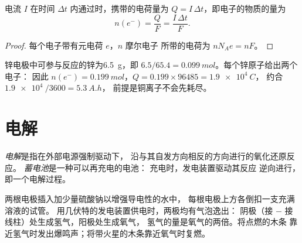\begin{proposition}[电荷与电子的物质的量]\label{prop:g12:cells-and-electrolysis:charge}
电流 $I$ 在时间 $\Delta t$ 内通过时，携带的电荷量为
$Q = I\,\Delta t$，即电子的物质的量为
\[
  n(e^-) = \frac{Q}{F} = \frac{I\,\Delta t}{F} .
\]
\end{proposition}

\begin{proof}
每个电子带有元电荷 $e$，$n$ 摩尔电子
所带的电荷为 $n N_A e = n F$。
\end{proof}

\begin{example}[丹尼尔电池的电量]\label{ex:g12:cells-and-electrolysis:capacity}
锌电极中可参与反应的锌为\qty{6.5}{g}，即
$6.5/65.4 = \qty{0.099}{mol}$。每个锌原子给出两个电子：
因此 $n(e^-) = \qty{0.199}{mol}$，$Q = 0.199 \times 96485 = \qty{1.9e4}{C}$，
约合 $\qty{1.9e4}{}/3600 = \qty{5.3}{A.h}$，
前提是铜离子不会先耗尽。
\end{example}

\section{电解}

\begin{definition}[电解，蓄电池]\label{def:g12:cells-and-electrolysis:electrolysis}
\emph{电解}是指在外部电源强制驱动下，
沿与其自发方向相反的方向进行的氧化还原反应。
\emph{蓄电池}是一种可以再充电的电池：
充电时，发电装置驱动其反应
逆向进行，即一个电解过程。
\end{definition}

\begin{inthelab}[电解水]
两根电极插入加少量硫酸钠以增强导电性的水中，
每根电极上方各倒扣一支充满溶液的试管。
用几伏特的发电装置供电时，两极均有气泡逸出：
阴极（接 $-$ 接线柱）处生成氢气，阳极处生成氧气，
氢气的量是氧气的两倍。将点燃的木条
靠近氢气时发出爆鸣声；将带火星的木条靠近氧气时复燃。
\end{inthelab}

